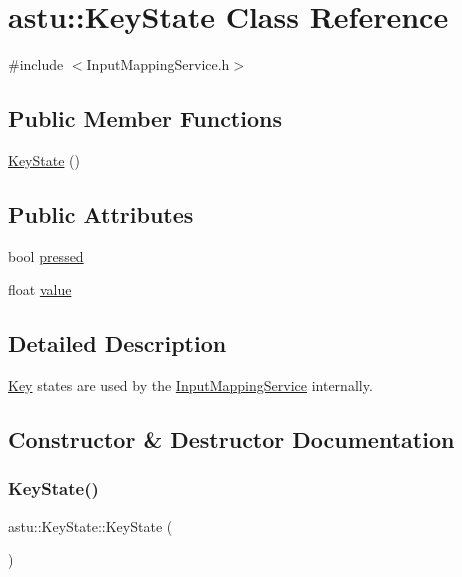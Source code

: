 \hypertarget{classastu_1_1KeyState}{}\section{astu\+:\+:Key\+State Class Reference}
\label{classastu_1_1KeyState}


{\ttfamily \#include $<$Input\+Mapping\+Service.\+h$>$}

\subsection*{Public Member Functions}
\begin{DoxyCompactItemize}
\item 
\hyperlink{classastu_1_1KeyState_aa24652b7a3ccc72de4335a4b47d9e030}{Key\+State} ()
\end{DoxyCompactItemize}
\subsection*{Public Attributes}
\begin{DoxyCompactItemize}
\item 
bool \hyperlink{classastu_1_1KeyState_a3fe7d828adc3d4d652793fc922d8b82b}{pressed}
\item 
float \hyperlink{classastu_1_1KeyState_a8a322e8769c1ab8ae657a05839543bac}{value}
\end{DoxyCompactItemize}


\subsection{Detailed Description}
\hyperlink{classastu_1_1Key}{Key} states are used by the \hyperlink{classastu_1_1InputMappingService}{Input\+Mapping\+Service} internally. 

\subsection{Constructor \& Destructor Documentation}
\mbox{\label{classastu_1_1KeyState_aa24652b7a3ccc72de4335a4b47d9e030}} 
\subsubsection{\texorpdfstring{Key\+State()}{KeyState()}}
{\footnotesize\ttfamily astu\+::\+Key\+State\+::\+Key\+State (\begin{DoxyParamCaption}{ }\end{DoxyParamCaption})\hspace{0.3cm}{\ttfamily [inline]}}

